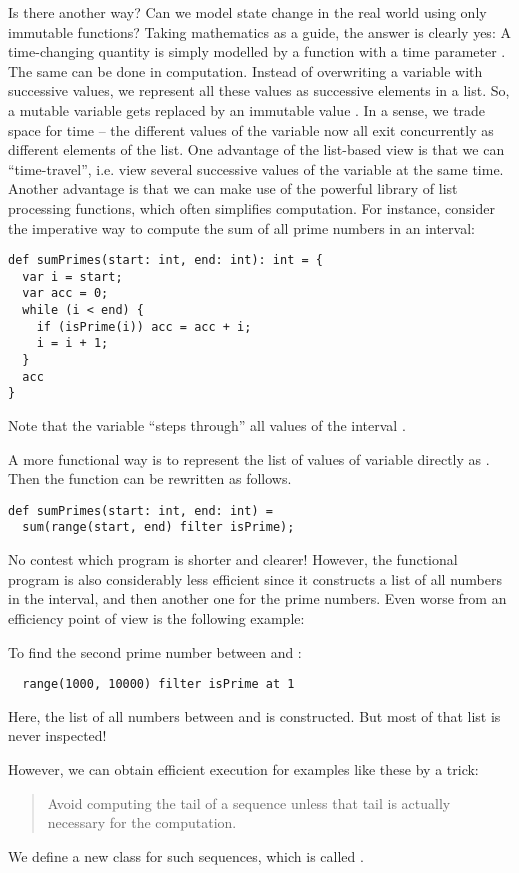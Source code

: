 \documentclass[a4paper,12pt,twoside,titlepage]{book}
\begin{document}
{Is there another way? Can we model state change in the real world
using only immutable functions? Taking mathematics as a guide, the
answer is clearly yes: A time-changing quantity is simply modelled by
a function  with a time parameter . The same can be
done in computation. Instead of overwriting a variable with successive
values, we represent all these values as successive elements in a
list. So, a mutable variable  gets replaced by an
immutable value . In a sense, we trade space for
time -- the different values of the variable now all exit concurrently
as different elements of the list.  One advantage of the list-based
view is that we can ``time-travel'', i.e. view several successive
values of the variable at the same time. Another advantage is that we
can make use of the powerful library of list processing functions,
which often simplifies computation. For instance, consider the
imperative way to compute the sum of all prime numbers in an interval:
\begin{lstlisting}
def sumPrimes(start: int, end: int): int = {
  var i = start;
  var acc = 0;
  while (i < end) {
    if (isPrime(i)) acc = acc + i;
    i = i + 1;
  }
  acc
}
\end{lstlisting}
Note that the variable  ``steps through'' all values of the interval
.

A more functional way is to represent the list of values of variable  directly as . Then the function can be rewritten as follows.
\begin{lstlisting}
def sumPrimes(start: int, end: int) =
  sum(range(start, end) filter isPrime);
\end{lstlisting}

No contest which program is shorter and clearer!  However, the
functional program is also considerably less efficient since it
constructs a list of all numbers in the interval, and then another one
for the prime numbers. Even worse from an efficiency point of view is
the following example:

To find the second prime number between  and :
\begin{lstlisting}
  range(1000, 10000) filter isPrime at 1
\end{lstlisting}
Here, the list of all numbers between  and  is
constructed.  But most of that list is never inspected!

However, we can obtain efficient execution for examples like these by
a trick:
\begin{quote}
 Avoid computing the tail of a sequence unless that tail is actually
     necessary for the computation.
\end{quote}
We define a new class for such sequences, which is called .

}
\end{document}
